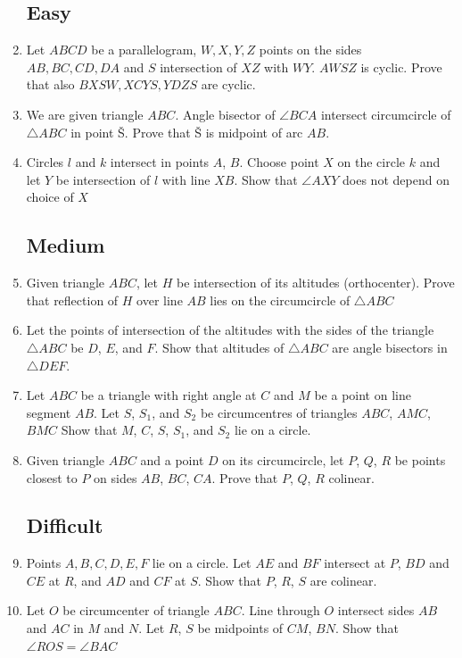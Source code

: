 \documentclass[11pt,a5paper]{article}
\begin{document}
\begin{enumerate}
	\subsection*{Easy}

\item{Let $ABCD$ be a parallelogram, $W, X, Y, Z$ points on the sides \\ $AB, BC, CD, DA$ and $S$ intersection of $XZ$ with $WY$. $AWSZ$ is cyclic. Prove that also $BXSW, XCYS, YDZS$ are cyclic.}

	\item{We are given triangle $ABC$. Angle bisector of $\angle BCA$} intersect circumcircle of $\triangle ABC$ in point \v{S}. Prove that \v{S} is midpoint of arc $AB$.
	
	\item{Circles $l$ and $k$ intersect in points $A$, $B$. Choose point $X$ on the circle $k$ and let $Y$ be intersection of $l$ with line $XB$. Show that $\angle AXY$ does not depend on choice of $X$}

	\subsection*{Medium}
	
	\item{Given triangle $ABC$, let $H$ be intersection of its altitudes (orthocenter). Prove that reflection of $H$ over line $AB$ lies on the circumcircle of $\triangle ABC$}	
	
	\item{Let the points of intersection of the altitudes with the sides of the triangle $\triangle ABC$ be $D$, $E$, and $F$. Show that altitudes of $\triangle ABC$ are angle bisectors in $\triangle DEF$.}
	
	\item{Let $ABC$ be a triangle with right angle at $C$ and $M$ be a point on line segment $AB$. Let $S$, $S_1$, and $S_2$ be circumcentres of triangles $ABC$, $ AMC$, $BMC$ Show that $M$, $C$, $S$, $S_1$, and $S_2$ lie on a circle. }
		
	\item{Given triangle $ABC$ and a point $D$ on its circumcircle, let $P$, $Q$, $R$ be points closest to $P$ on sides $AB$, $BC$, $CA$. Prove that $P$, $Q$, $R$ colinear.}
	
	
	
\subsection*{Difficult}
	
	\item{Points $A, B, C, D, E, F$ lie on a circle. Let $AE$ and $BF$ intersect at $P$, $BD$ and $CE$ at $R$, and $AD$ and $CF$ at $S$. Show that $P$, $R$, $S$ are colinear.}
	
	\item{Let $O$ be circumcenter of triangle $ABC$. Line through $O$ intersect sides $AB$ and $AC$ in $M$ and $N$. Let $R$, $S$ be midpoints of $CM$, $BN$. Show that $\angle ROS = \angle BAC$}

\end{enumerate}
\end{document}
